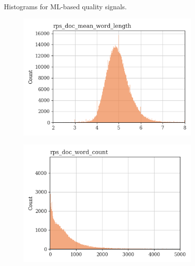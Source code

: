 \documentclass{article}
\begin{document}
\begin{figure}
\begin{subfigure}[b]{0.32\textwidth}
    \end{subfigure}
    \caption{Histograms for ML-based quality signals.}
    \label{fig:ml-qs-dist}
\end{figure}

\begin{figure}
     \centering
     \begin{subfigure}[b]{0.32\textwidth}
         \centering
         \includegraphics[width=\textwidth]{figures/quality_signals/rps_doc_mean_word_length.png}
     \end{subfigure}
     \hfill
     \begin{subfigure}[b]{0.32\textwidth}
         \centering
         \includegraphics[width=\textwidth]{figures/quality_signals/rps_doc_word_count.png}
     \end{subfigure}
     \hfill
     \begin{subfigure}[b]{0.32\textwidth}

\end{subfigure}
\end{figure}
\end{document}
